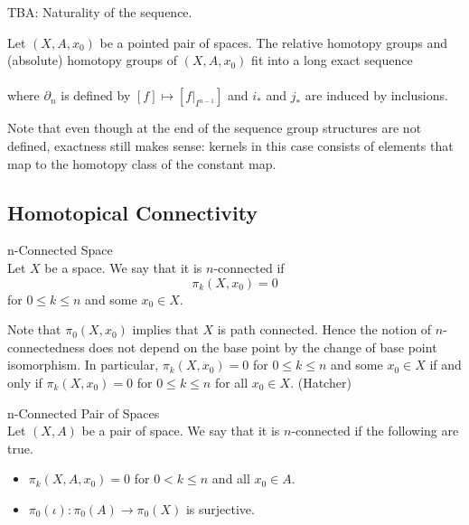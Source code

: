 \documentclass[a4paper]{article}
\begin{document}
TBA: Naturality of the sequence. 

\begin{thm}{}{} Let $(X,A,x_0)$ be a pointed pair of spaces. The relative homotopy groups and (absolute) homotopy groups of $(X,A,x_0)$ fit into a long exact sequence \\
\\
where $\partial_n$ is defined by $[f]\mapsto [f|_{I^{n-1}}]$ and $i_\ast$ and $j_\ast$ are induced by inclusions. 
\end{thm}

Note that even though at the end of the sequence group structures are not defined, exactness still makes sense: kernels in this case consists of elements that map to the homotopy class of the constant map. 

\subsection{Homotopical Connectivity}
\begin{defn}{n-Connected Space}{}\\
Let $X$ be a space. We say that it is $n$-connected if $$\pi_k(X,x_0)=0$$ for $0\leq k\leq n$ and some $x_0\in X$. 
\end{defn}

Note that $\pi_0(X,x_0)$ implies that $X$ is path connected. Hence the notion of $n$-connectedness does not depend on the base point by the change of base point isomorphism. In particular, $\pi_k(X,x_0)=0$ for $0\leq k\leq n$ and some $x_0\in X$ if and only if $\pi_k(X,x_0)=0$ for $0\leq k\leq n$ for all $x_0\in X$. (Hatcher)

\begin{defn}{n-Connected Pair of Spaces}{}\\
Let $(X,A)$ be a pair of space. We say that it is $n$-connected if the following are true. 
\begin{itemize}
\item $\pi_k(X,A,x_0)=0$ for $0<k\leq n$ and all $x_0\in A$. 
\item $\pi_0(\iota):\pi_0(A)\to\pi_0(X)$ is surjective. 
\end{itemize}
\end{defn}
\end{document}
